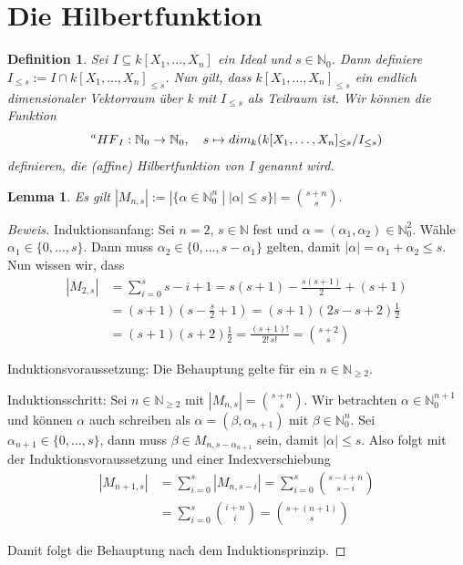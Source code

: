 \documentclass{article}
\newtheorem{definition}[satz]{Definition}
\newtheorem{lemma}[satz]{Lemma}
\newcommand*{\R}{k[X_{1},\ldots,X_{n}]}
\begin{document}
\section{Die Hilbertfunktion}

	\begin{definition} \label{1.2.11}
	Sei \(I \subseteq \R\) ein Ideal und \(s \in \mathbb{N}_{0}\). Dann definiere \(I_{\leq s} :=
	I \cap \R_{\leq s}\). Nun gilt, dass \(\R_{\leq s}\) ein endlich dimensionaler Vektorraum über
	k  mit \(I_{\leq s}\) als Teilraum ist. Wir können die Funktion \begin{displaymath}
	\prescript{a}{}{HF}_{I} : \mathbb{N}_{0} \rightarrow \mathbb{N}_{0}, \quad s \mapsto
	dim_{k}(\R_{\leq s}/I_{\leq s})	\end{displaymath} definieren, die (affine) Hilbertfunktion
	von I genannt wird.
	\end{definition}

	
	\begin{lemma}\label{kombinatorik}
	Es gilt \(|M_{n,s}| := |\{\alpha \in \mathbb{N}^{n}_{0}\; |\; |\alpha| \leq s \}| = \binom{s + n}{s}. \)
	\end{lemma}

	\begin{proof}[Beweis]
	Induktionsanfang: Sei \(n = 2\), \(s \in \mathbb{N}\) fest und \(\alpha = (\alpha_{1}, 
	\alpha_{2}) \in \mathbb{N}^{2}_{0}\). Wähle \(\alpha_{1} \in \{0, \ldots, s\}\). Dann muss
	\(\alpha_{2} \in \{0, \ldots, s - \alpha_{1}\}\) gelten, damit \(|\alpha| = \alpha_{1} +
	\alpha_{2} \leq s\). Nun wissen wir, dass
	\begin{align*}
		|M_{2,s}| &= \sum_{i=0}^{s} s-i+1 = s(s+1) - \frac{s(s+1)}{2} + (s+1) \\
		&= (s+1)(s - \frac{s}{2} + 1) = (s+1)(2s - s +2)\frac{1}{2} \\
		&= (s+1)(s+2)\frac{1}{2} = \frac{(s+1)!}{2!\,s!} = \binom{s+2}{s}
	\end{align*}
	
	Induktionsvoraussetzung: Die Behauptung gelte für ein \(n \in \mathbb{N}_{\geq 2}\).

	Induktionsschritt: Sei \(n \in \mathbb{N}_{\geq 2}\) mit \(|M_{n,s}| = \binom{s + n}{s}\). Wir
	betrachten \(\alpha \in \mathbb{N}^{n+1}_{0}\) und können \(\alpha\) auch schreiben als
	\(\alpha = (\beta, \alpha_{n+1})\) mit \(\beta \in \mathbb{N}^{n}_{0}\). Sei \(\alpha_{n+1}
	\in \{0, \ldots, s\}\), dann muss \(\beta \in M_{n,s-\alpha_{n+1}}\) sein, damit
	\(|\alpha| \leq s\). Also folgt mit der Induktionsvoraussetzung und einer Indexverschiebung
	\begin{align*}
		|M_{n+1,s}| &= \sum_{i=0}^{s} |M_{n,s-i}| = \sum_{i=0}^{s} \binom{s-i+n}{s-i} \\
		&= \sum_{i=0}^{s} \binom{i+n}{i} = \binom{s+(n+1)}{s}
	\end{align*}

	Damit folgt die Behauptung nach dem Induktionsprinzip.
	\end{proof}
\end{document}
